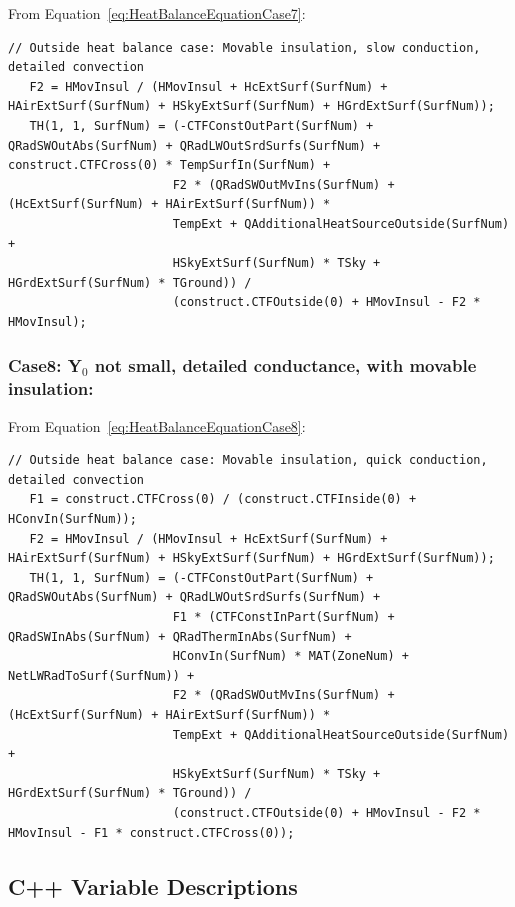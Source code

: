 From Equation~\ref{eq:HeatBalanceEquationCase7}:

\begin{lstlisting}
// Outside heat balance case: Movable insulation, slow conduction, detailed convection
   F2 = HMovInsul / (HMovInsul + HcExtSurf(SurfNum) + HAirExtSurf(SurfNum) + HSkyExtSurf(SurfNum) + HGrdExtSurf(SurfNum));
   TH(1, 1, SurfNum) = (-CTFConstOutPart(SurfNum) + QRadSWOutAbs(SurfNum) + QRadLWOutSrdSurfs(SurfNum) + construct.CTFCross(0) * TempSurfIn(SurfNum) +
                       F2 * (QRadSWOutMvIns(SurfNum) + (HcExtSurf(SurfNum) + HAirExtSurf(SurfNum)) * 
                       TempExt + QAdditionalHeatSourceOutside(SurfNum) +
                       HSkyExtSurf(SurfNum) * TSky + HGrdExtSurf(SurfNum) * TGround)) /
                       (construct.CTFOutside(0) + HMovInsul - F2 * HMovInsul);
\end{lstlisting}

\subsubsection{Case8: Y\(_{0}\) not small, detailed conductance, with movable insulation:}\label{case8-yux5f0-not-small-detailed-conductance-with-movable-insulation-1}

From Equation~\ref{eq:HeatBalanceEquationCase8}:

\begin{lstlisting}
// Outside heat balance case: Movable insulation, quick conduction, detailed convection
   F1 = construct.CTFCross(0) / (construct.CTFInside(0) + HConvIn(SurfNum));
   F2 = HMovInsul / (HMovInsul + HcExtSurf(SurfNum) + HAirExtSurf(SurfNum) + HSkyExtSurf(SurfNum) + HGrdExtSurf(SurfNum));
   TH(1, 1, SurfNum) = (-CTFConstOutPart(SurfNum) + QRadSWOutAbs(SurfNum) + QRadLWOutSrdSurfs(SurfNum) +
                       F1 * (CTFConstInPart(SurfNum) + QRadSWInAbs(SurfNum) + QRadThermInAbs(SurfNum) + 
                       HConvIn(SurfNum) * MAT(ZoneNum) + NetLWRadToSurf(SurfNum)) +
                       F2 * (QRadSWOutMvIns(SurfNum) + (HcExtSurf(SurfNum) + HAirExtSurf(SurfNum)) * 
                       TempExt + QAdditionalHeatSourceOutside(SurfNum) +
                       HSkyExtSurf(SurfNum) * TSky + HGrdExtSurf(SurfNum) * TGround)) /
                       (construct.CTFOutside(0) + HMovInsul - F2 * HMovInsul - F1 * construct.CTFCross(0));
\end{lstlisting}

\subsection{C++ Variable Descriptions}\label{c++-variable-descriptions}

